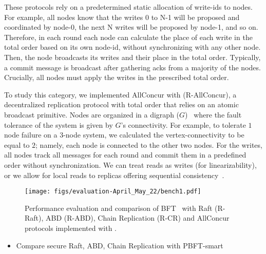  These protocols rely on a predetermined static allocation of write-ids to nodes. For example, all nodes know that the writes 0 to N-1 will be proposed and coordinated by node-0, the next N writes will be proposed by node-1, and so on. Therefore, in each round each node can calculate the place of each write in the total order based on its own node-id, without synchronizing with any other node. Then, the node broadcasts its writes and their place in the total order. Typically, a commit message is broadcast after gathering acks from a majority of the nodes. Crucially, all nodes must apply the writes in the prescribed total order.

 To study this category, we implemented AllConcur with \projecttitle{} (R-AllConcur), a decentralized replication protocol with total order that relies on an atomic broadcast primitive. Nodes are organized in a digraph ($G$)~\cite{Poke2016AllConcurLC} where the fault tolerance of the system is given by $G$'s connectivity. For example, to tolerate $1$ node failure on a $3$-node system, we calculated the vertex-connectivity to be equal to $2$; namely, each node is connected to the other two nodes.
For the writes, all nodes track all messages for each round and commit them in a predefined order without synchronization. We can treat reads as writes (for linearizability), or we allow for local reads to replicas offering sequential consistency~\cite{Hunt:2010}.





\begin{figure*}
    \centering
       \texttt{[image: figs/evaluation-April\_May\_22/bench1.pdf]}
    \caption{Performance evaluation and comparison of BFT~\cite{bft-smart} with Raft (R-Raft), ABD (R-ABD), Chain Replication (R-CR) and AllConcur protocols implemented with \projecttitle{}.}
    \label{fig:end_to_end_perf}
\end{figure*}
\fi



\begin{itemize}
    \item Compare secure Raft, ABD, Chain Replication with PBFT-smart
\end{itemize}
\fi 


